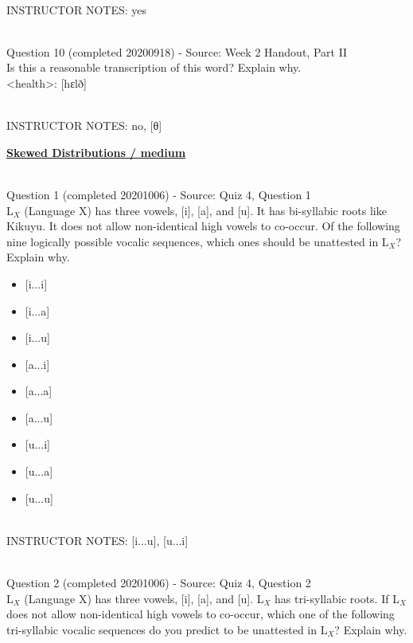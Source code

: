\documentclass[12pt]{article}
\begin{document}
~\\
INSTRUCTOR NOTES: yes


~\\

{\large Question 10} (completed 20200918) - Source: Week 2 Handout, Part II\\

Is this a reasonable transcription of this word? Explain why.\\

<health>: {[hɛlð]}


~\\
INSTRUCTOR NOTES: no, [θ]


\newpage\textbf{\underline{\huge Skewed Distributions / medium\\}}

~\\

{\large Question 1} (completed 20201006) - Source: Quiz 4, Question 1\\

L$_X$ (Language X) has three vowels, [i], [a], and [u]. It has bi-syllabic roots like Kikuyu. It does not allow non-identical high vowels to co-occur. Of the following nine logically possible vocalic sequences, which ones should be unattested in L$_X$? Explain why.\\

\begin{itemize} \item {[i...i]} \item {[i...a]} \item {[i...u]} \item {[a...i]} \item {[a...a]} \item {[a...u]} \item {[u...i]} \item {[u...a]} \item {[u...u]} \end{itemize}


~\\
INSTRUCTOR NOTES: [i...u], [u...i]


~\\

{\large Question 2} (completed 20201006) - Source: Quiz 4, Question 2\\

L$_X$ (Language X) has three vowels, [i], [a], and [u]. L$_X$ has tri-syllabic roots. If L$_X$ does not allow non-identical high vowels to co-occur, which one of the following tri-syllabic vocalic sequences do you predict to be unattested in L$_X$? Explain why.\\
\end{document}

